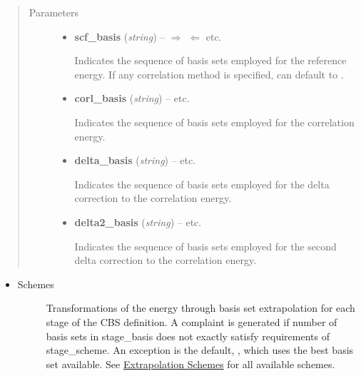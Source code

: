 \documentclass[letterpaper,10pt,english]{sphinxmanual}
\begin{document}
\begin{fulllineitems}
\begin{itemize}
\begin{description}
\end{description}

\end{itemize}
\begin{quote}\begin{description}
\item[{Parameters}] \leavevmode\begin{itemize}
\item {} 
\textbf{scf\_basis} (\emph{string}) -- 
$\Rightarrow$  $\Leftarrow$ \textbar{}\textbar{}  \textbar{}\textbar{}  \textbar{}\textbar{}  \textbar{}\textbar{} etc.

Indicates the sequence of basis sets employed for the reference energy.
If any correlation method is specified,  can default
to .


\item {} 
\textbf{corl\_basis} (\emph{string}) -- 
 \textbar{}\textbar{}  \textbar{}\textbar{}  \textbar{}\textbar{} etc.

Indicates the sequence of basis sets employed for the correlation energy.


\item {} 
\textbf{delta\_basis} (\emph{string}) -- 
 \textbar{}\textbar{}  \textbar{}\textbar{}  \textbar{}\textbar{} etc.

Indicates the sequence of basis sets employed for the delta correction
to the correlation energy.


\item {} 
\textbf{delta2\_basis} (\emph{string}) -- 
 \textbar{}\textbar{}  \textbar{}\textbar{}  \textbar{}\textbar{} etc.

Indicates the sequence of basis sets employed for the second delta correction
to the correlation energy.


\end{itemize}

\end{description}\end{quote}
\begin{itemize}
\item {} \begin{description}
\item[{Schemes}] \leavevmode
Transformations of the energy through basis set extrapolation for each
stage of the CBS definition. A complaint is generated if number of basis
sets in stage\_basis does not exactly satisfy requirements of stage\_scheme.
An exception is the default, , which uses the best basis
set available. See {\hyperref[index:extrapolation-schemes]{Extrapolation Schemes}} for all available schemes.


\end{description}
\end{itemize}
\end{fulllineitems}
\end{document}
